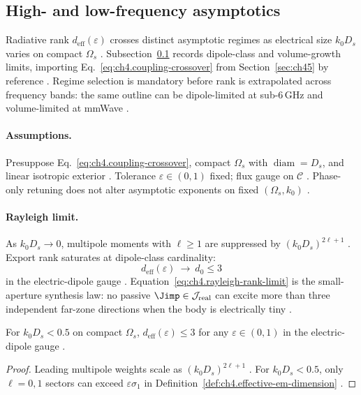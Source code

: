 ﻿\subsection{High- and low-frequency asymptotics}
\label{sec:ch482}

Radiative rank \(d_{\mathrm{eff}}(\varepsilon)\) crosses distinct asymptotic regimes as electrical size \(k_{0}D_{s}\) varies on compact
\(\Omega_{s}\) \cite{stratton1941,jackson1999,hansen1988}. Subsection~\ref{sec:ch482} records dipole-class and volume-growth limits, importing
Eq.~\eqref{eq:ch4.coupling-crossover} from Section~\ref{sec:ch45} by reference \cite{harrington2001,devaney2004}. Regime selection is mandatory
before rank is extrapolated across frequency bands: the same outline can be dipole-limited at sub-6\,GHz and volume-limited at mmWave
\cite{jackson1999,harrington2001,collin2001}.

\paragraph{Assumptions.}
Presuppose Eq.~\eqref{eq:ch4.coupling-crossover}, compact \(\Omega_{s}\) with \(\operatorname{diam}=D_{s}\), and linear isotropic exterior
\cite{stratton1941,hansen1988,jackson1999}. Tolerance \(\varepsilon\in(0,1)\) fixed; flux gauge on \(\mathcal{C}\) \cite{harrington2001,devaney2004}.
Phase-only retuning does not alter asymptotic exponents on fixed \((\Omega_{s},k_{0})\) \cite{devaney2004,hansen1988}.

\paragraph{Rayleigh limit.}
As \(k_{0}D_{s}\to0\), multipole moments with \(\ell\ge1\) are suppressed by \((k_{0}D_{s})^{2\ell+1}\) \cite{jackson1999,stratton1941}. Export rank
saturates at dipole-class cardinality:
\begin{equation}
\label{eq:ch4.rayleigh-rank-limit}
d_{\mathrm{eff}}(\varepsilon)\ \longrightarrow\ d_{0}\le3
\end{equation}
in the electric-dipole gauge \cite{harrington2001,hansen1988}. Equation~\eqref{eq:ch4.rayleigh-rank-limit} is the small-aperture synthesis law: no
passive \(\Jimp\in\mathcal{J}_{\mathrm{real}}\) can excite more than three independent far-zone directions when the body is electrically tiny
\cite{stratton1941,jackson1999}.

\begin{theorem}
\label{thm:ch4.rayleigh-dipole-cap}
For \(k_{0}D_{s}<0.5\) on compact \(\Omega_{s}\), \(d_{\mathrm{eff}}(\varepsilon)\le3\) for any \(\varepsilon\in(0,1)\) in the electric-dipole
gauge \cite{jackson1999,stratton1941,harrington2001,hansen1988}.
\end{theorem}
\begin{proof}
Leading multipole weights scale as \((k_{0}D_{s})^{2\ell+1}\) \cite{jackson1999}. For \(k_{0}D_{s}<0.5\), only \(\ell=0,1\) sectors can exceed
\(\varepsilon\sigma_{1}\) in Definition~\ref{def:ch4.effective-em-dimension} \cite{stratton1941,harrington2001,hansen1988}.
\end{proof}

